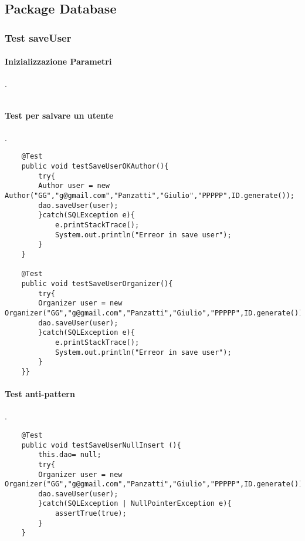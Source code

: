 \subsection{Package Database}
\label{sec:test_unita_package_database}

\subsubsection{Test saveUser}
\paragraph{Inizializzazione Parametri}
.
\begin{lstlisting}  
\end{lstlisting}
\paragraph{Test per salvare un utente  }
.
\begin{lstlisting}
	@Test
	public void testSaveUserOKAuthor(){
		try{
		Author user = new Author("GG","g@gmail.com","Panzatti","Giulio","PPPPP",ID.generate());
		dao.saveUser(user);
		}catch(SQLException e){
			e.printStackTrace();
			System.out.println("Erreor in save user");
		}
	}

	@Test
	public void testSaveUserOrganizer(){
		try{
		Organizer user = new Organizer("GG","g@gmail.com","Panzatti","Giulio","PPPPP",ID.generate());
		dao.saveUser(user);
		}catch(SQLException e){
			e.printStackTrace();
			System.out.println("Erreor in save user");
		}
	}}
\end{lstlisting}
\paragraph{Test anti-pattern }
.
\begin{lstlisting}
	@Test
	public void testSaveUserNullInsert (){
		this.dao= null;
		try{
		Organizer user = new Organizer("GG","g@gmail.com","Panzatti","Giulio","PPPPP",ID.generate());
		dao.saveUser(user); 
		}catch(SQLException | NullPointerException e){
			assertTrue(true);
		}
	}
\end{lstlisting}
